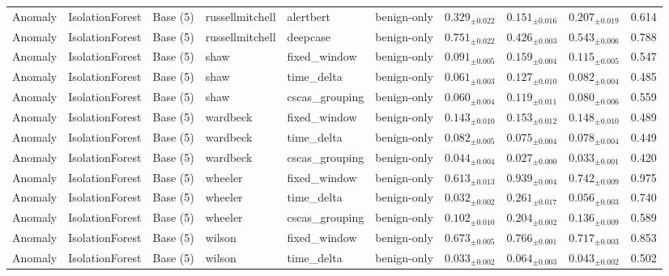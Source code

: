 \begin{longtable}{llllllcccc}
\addlinespace
Anomaly & IsolationForest & Base (5) & russellmitchell & alertbert & benign-only & $0.329_{\pm 0.022}$ & $0.151_{\pm 0.016}$ & $0.207_{\pm 0.019}$ & 0.614 \\
\addlinespace
Anomaly & IsolationForest & Base (5) & russellmitchell & deepcase & benign-only & $0.751_{\pm 0.022}$ & $0.426_{\pm 0.003}$ & $0.543_{\pm 0.006}$ & 0.788 \\
\addlinespace
Anomaly & IsolationForest & Base (5) & shaw & fixed\_window & benign-only & $0.091_{\pm 0.005}$ & $0.159_{\pm 0.004}$ & $0.115_{\pm 0.005}$ & 0.547 \\
\addlinespace
Anomaly & IsolationForest & Base (5) & shaw & time\_delta & benign-only & $0.061_{\pm 0.003}$ & $0.127_{\pm 0.010}$ & $0.082_{\pm 0.004}$ & 0.485 \\
\addlinespace
Anomaly & IsolationForest & Base (5) & shaw & cscas\_grouping & benign-only & $0.060_{\pm 0.004}$ & $0.119_{\pm 0.011}$ & $0.080_{\pm 0.006}$ & 0.559 \\
\addlinespace
Anomaly & IsolationForest & Base (5) & wardbeck & fixed\_window & benign-only & $0.143_{\pm 0.010}$ & $0.153_{\pm 0.012}$ & $0.148_{\pm 0.010}$ & 0.489 \\
\addlinespace
Anomaly & IsolationForest & Base (5) & wardbeck & time\_delta & benign-only & $0.082_{\pm 0.005}$ & $0.075_{\pm 0.004}$ & $0.078_{\pm 0.004}$ & 0.449 \\
\addlinespace
Anomaly & IsolationForest & Base (5) & wardbeck & cscas\_grouping & benign-only & $0.044_{\pm 0.004}$ & $0.027_{\pm 0.000}$ & $0.033_{\pm 0.001}$ & 0.420 \\
\addlinespace
Anomaly & IsolationForest & Base (5) & wheeler & fixed\_window & benign-only & $0.613_{\pm 0.013}$ & $0.939_{\pm 0.004}$ & $0.742_{\pm 0.009}$ & 0.975 \\
\addlinespace
Anomaly & IsolationForest & Base (5) & wheeler & time\_delta & benign-only & $0.032_{\pm 0.002}$ & $0.261_{\pm 0.017}$ & $0.056_{\pm 0.003}$ & 0.740 \\
\addlinespace
Anomaly & IsolationForest & Base (5) & wheeler & cscas\_grouping & benign-only & $0.102_{\pm 0.010}$ & $0.204_{\pm 0.002}$ & $0.136_{\pm 0.009}$ & 0.589 \\
\addlinespace
Anomaly & IsolationForest & Base (5) & wilson & fixed\_window & benign-only & $0.673_{\pm 0.005}$ & $0.766_{\pm 0.001}$ & $0.717_{\pm 0.003}$ & 0.853 \\
\addlinespace
Anomaly & IsolationForest & Base (5) & wilson & time\_delta & benign-only & $0.033_{\pm 0.002}$ & $0.064_{\pm 0.003}$ & $0.043_{\pm 0.002}$ & 0.502 \\

\end{longtable}
